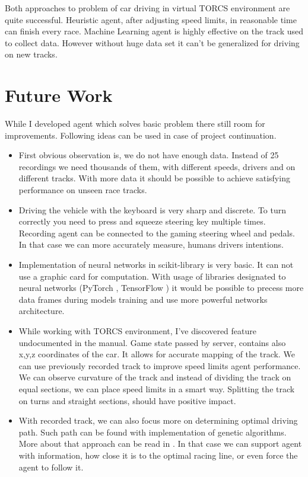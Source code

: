 \documentclass[declaration,shortabstract,english,inz]{iithesis}
\begin{document}
Both approaches to problem of car driving in virtual TORCS environment are quite successful.
Heuristic agent, after adjusting speed limits, in reasonable time can finish every race.
Machine Learning agent is highly effective on the track used to collect data.
However without huge data set it can't be generalized for driving on new tracks.


\section{Future Work}

While I developed agent which solves basic problem there still room for improvements.
Following ideas can be used in case of project continuation.
\begin{itemize}
    \item First obvious observation is, we do not have enough data.
Instead of 25 recordings we need thousands of them, with different speeds, drivers and on different tracks.
With more data it should be possible to achieve satisfying performance on unseen race tracks.

    \item Driving the vehicle with the keyboard is very sharp and discrete.
To turn correctly you need to press and squeeze steering key multiple times.
Recording agent can be connected to the gaming steering wheel and pedals.
In that case we can more accurately measure, humans drivers intentions.

    \item Implementation of neural networks in scikit-library is very basic.
It can not use a graphic card for computation.
With usage of libraries designated to neural networks (PyTorch \cite{py_torch}, TensorFlow \cite{tensor_flow}) it would be possible to precess more data frames during models training and use more  powerful networks architecture.

    \item While working with TORCS environment, I've discovered feature undocumented in the manual.
    Game state passed by server, contains also x,y,z coordinates of the car.
    It allows for accurate mapping of the track.
    We can use previously recorded track to improve speed limits agent performance.
    We can observe curvature of the track and instead of dividing the track on equal sections, we can place speed limits in a smart way.
    Splitting the track on turns and straight sections, should have positive impact.

    \item With recorded track, we can also focus more on determining optimal driving path.
    Such path can be found with implementation of genetic algorithms. More about that approach can be read in \cite{genetic-optimal-race-line}.
    In that case we can support agent with information, how close it is to the optimal racing line, or even force the agent to follow it.
    

\end{itemize}
\end{document}
